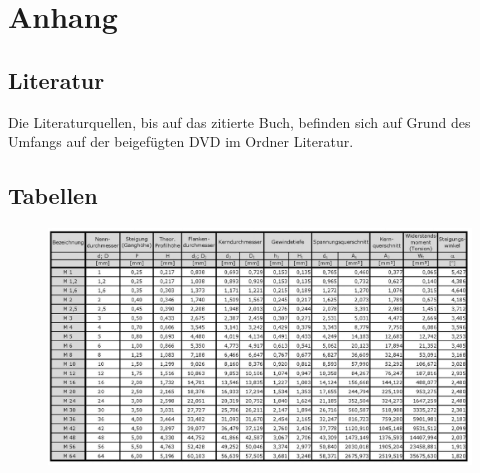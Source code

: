 {}

\listoffigures




{}










{}


\chapter*{Anhang}

\pagestyle{plain}

\section*{Literatur}

Die Literaturquellen, bis auf das zitierte Buch, befinden sich auf Grund des Umfangs auf der beigefügten DVD im Ordner \glqq Literatur\grqq .

\clearpage

\section*{Tabellen}

\begin{figure}[h!]  
	\begin{center}
		\includegraphics[page=1, scale=0.7, angle=90]{Anhang/Gewindetabelle.png}	
	\end{center}
\end{figure}

